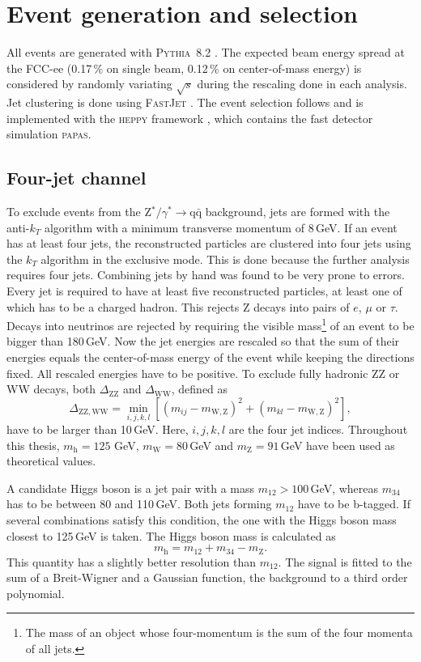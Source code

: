 \section{Event generation and selection}
All events are generated with \textsc{Pythia~8.2} \cite{pythia82}. The expected beam energy spread at the FCC-ee (0.17\,\% on single beam, 0.12\,\% on center-of-mass energy) is considered by randomly variating $\sqrt{s}$ during the rescaling done in each analysis. Jet clustering is done using \textsc{FastJet} \cite{fastjet}.
The event selection follows \cite{lep3-note} and is implemented with the \textsc{heppy} framework \cite{heppy}, which contains the fast detector simulation \textsc{papas}.

\subsection{Four-jet channel}
To exclude events from the Z$^*/\gamma^* \rightarrow \mathrm{q\bar{q}}$ background, jets are formed with the anti-$k_T$ algorithm \cite{antikt_algo} with a minimum transverse momentum of 8\,GeV. If an event has at least four jets, the reconstructed particles are clustered into four jets using the $k_T$ algorithm \cite{kt_algo} in the exclusive mode. This is done because the further analysis requires four jets. Combining jets by hand was found  to be very prone to errors.
Every jet is required to have at least five reconstructed particles,  at least one of which has to be a charged hadron. This rejects Z decays into pairs of $e$, $\mu$ or $\tau$. Decays into neutrinos are rejected by requiring the visible mass\footnote{The mass of an object whose four-momentum is the sum of the four momenta of all jets.} of an event to be bigger than 180\,GeV. Now the jet energies are rescaled so that the sum of their energies equals the center-of-mass energy of the event while keeping the directions fixed. 
All rescaled energies have to be positive.
To exclude fully hadronic ZZ or WW decays, both $\Delta_\mathrm{ZZ}$ and $\Delta_\mathrm{WW}$, defined as
\begin{equation}
\Delta_\mathrm{ZZ, WW} = \min_{i, j, k, l} [(m_{ij} - m_\mathrm{W, Z})^2 + (m_{kl} - m_\mathrm{W, Z})^2],
\end{equation}
have to be larger than 10\,GeV. Here, $i, j, k, l$ are the four jet indices. Throughout this thesis, $m_\mathrm{h} = 125\,$\,GeV, $m_\mathrm{W} = 80$\,GeV and  $m_\mathrm{Z} = 91$\,GeV have been used as theoretical values.

A candidate Higgs boson is a jet pair with a mass $m_{12} > 100$\,GeV, whereas $m_{34}$ has to be between 80 and 110\,GeV. Both jets forming $m_{12}$ have to be b-tagged. If several combinations satisfy this condition, the one with the Higgs boson mass closest to 125\,GeV is taken. The Higgs boson mass is calculated as
\begin{equation}
  m_\mathrm{h} = m_{12} + m_{34} - m_\mathrm{Z}.
\label{eq:higgsmass}
\end{equation}
This quantity has a slightly better resolution than $m_{12}$.
The signal is fitted to the sum of a Breit-Wigner and a Gaussian function, the background to a third order polynomial.